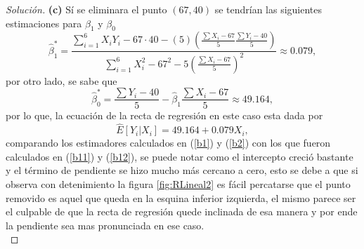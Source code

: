 \documentclass[10.5pt,notitlepage]{article}
\newenvironment{solucion}
  {\begin{proof}[Solución]}
  {\end{proof}}
\newcommand{\pare}[1]{\left( #1 \right)}
\begin{document}
\begin{solucion}
\noindent\textbf{(c)} Sí se eliminara el punto \((67,40)\) se tendrían las siguientes estimaciones para \(\beta_1\) y \(\beta_0\)
\begin{equation}\label{b11}
    \hat{\beta}_{1}^{*}= \frac{\sum_{i=1}^{6}X_iY_i -67\cdot 40 - (5)\pare{\frac{\sum X_i - 67}{5}\frac{\sum Y_i - 40}{5}}}{\sum_{i=1}^{6}X_{i}^2- 67^2 - 5\pare{\frac{\sum X_i - 67}{5}} ^2} \approx 0.079, 
\end{equation}
por otro lado, se sabe que 
\begin{equation}\label{b12}
    \hat{\beta}_{0}^{*} = \frac{\sum Y_i - 40}{5} - \hat{\beta}_1\frac{\sum X_i - 67}{5} \approx 49.164,
\end{equation}
por lo que, la ecuación de la recta de regresión en este caso esta dada por 
\begin{equation}\label{b13}
   \widehat{E}[Y_i|X_i] = 49.164 +  0.079 X_i,  
\end{equation}
comparando los estimadores calculados en (\ref{b1}) y (\ref{b2}) con los que fueron calculados en (\ref{b11}) y (\ref{b12}), se puede notar como el intercepto creció bastante y el término de pendiente se hizo mucho más cercano a cero, esto se debe a que si observa con detenimiento la figura \ref{fig:RLineal2} es fácil percatarse que el punto removido es aquel que queda en la esquina inferior izquierda, el mismo parece ser el culpable de que la recta de regresión quede inclinada de esa manera y por ende la pendiente sea mas pronunciada en ese caso. \\ 


\end{solucion}
\end{document}
